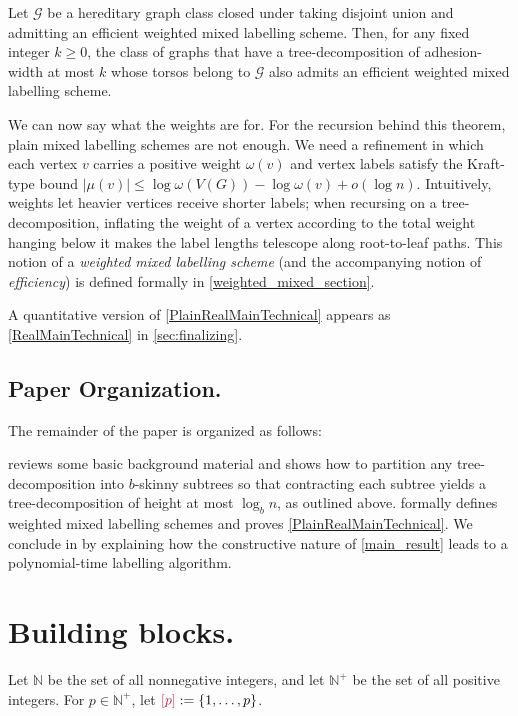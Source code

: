 \documentclass[twoside,leqno]{article}
\makeatletter
\newcommand{\N}{\mathbb{N}}
\renewcommand{\le}{\leqslant}
\renewcommand{\geq}{\geqslant}
\newcommand{\defin}[1]{\emph{\textcolor{brightmaroon}{#1}}}
\def\mathcolor#1#{\@mathcolor{#1}}
\def\@mathcolor#1#2#3{%
  \protect\leavevmode
  \begingroup
    \color#1{#2}#3%
  \endgroup
}
\newcommand{\mathdefin}[1]{\mathcolor{brightmaroon}{#1}}
\DeclarePairedDelimiter{\set}{\{}{\}}
\makeatother
\begin{document}
\begin{thm}\label{PlainRealMainTechnical}
  Let $\mathcal{G}$ be a hereditary graph class closed under taking disjoint union and admitting an efficient weighted mixed labelling scheme. Then, for any fixed integer $k\geq 0$, the class of graphs that have a tree-decomposition of adhesion-width at most $k$ whose torsos belong to $\mathcal{G}$ also admits an efficient weighted mixed labelling scheme.
\end{thm}

We can now say what the weights are for. For the recursion behind this theorem, plain mixed labelling schemes are not enough. We need a refinement in which each vertex $v$ carries a positive weight $\omega(v)$ and vertex labels satisfy the Kraft-type bound $|\mu(v)|\le\log\omega(V(G))-\log\omega(v)+o(\log n)$. Intuitively, weights let heavier vertices receive shorter labels; when recursing on a tree-decomposition, inflating the weight of a vertex according to the total weight hanging below it makes the label lengths telescope along root-to-leaf paths. This notion of a \defin{weighted mixed labelling scheme} (and the accompanying notion of \emph{efficiency}) is defined formally in \cref{weighted_mixed_section}.


A quantitative version of \cref{PlainRealMainTechnical} appears as \cref{RealMainTechnical} in \cref{sec:finalizing}.

\subsection{Paper Organization.}

The remainder of the paper is organized as follows:  

 reviews some basic background material and shows how to
partition any tree-decomposition into $b$-skinny subtrees so that contracting
each subtree yields a tree-decomposition of height at most $\log_b n$, as outlined above.     formally defines weighted mixed labelling schemes and proves \cref{PlainRealMainTechnical}.
We conclude in  by explaining how the constructive nature of \cref{main_result} leads to a
polynomial-time labelling algorithm.

\section{Building blocks.}\label{building_blocks}

Let \defin{$\N$} be the set of all nonnegative integers, and let \defin{$\N^+$} be the set of all positive integers.  For $p\in\N^+$, let $\mathdefin{[p]} := \set{1,\dots,p}$. 
\end{document}
